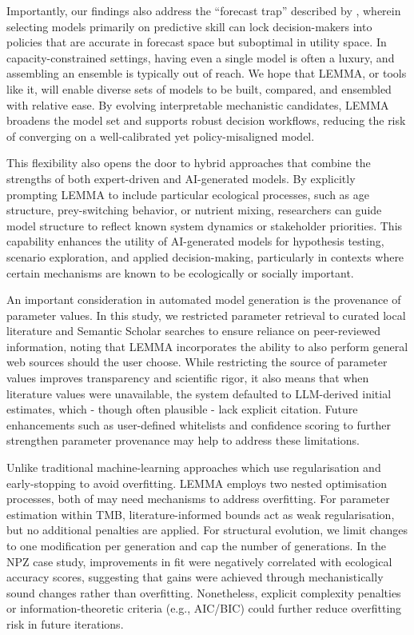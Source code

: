 Importantly, our findings also address the “forecast trap” described by \citep{Boettiger2022}, wherein selecting models primarily on predictive skill can lock decision-makers into policies that are accurate in forecast space but suboptimal in utility space. In capacity-constrained settings, having even a single model is often a luxury, and assembling an ensemble is typically out of reach. We hope that LEMMA, or tools like it, will enable diverse sets of models to be built, compared, and ensembled with relative ease. By evolving interpretable mechanistic candidates, LEMMA broadens the model set and supports robust decision workflows, reducing the risk of converging on a well-calibrated yet policy-misaligned model.

This flexibility also opens the door to hybrid approaches that combine the strengths of both expert-driven and AI-generated models. By explicitly prompting LEMMA to include particular ecological processes, such as age structure, prey-switching behavior, or nutrient mixing, researchers can guide model structure to reflect known system dynamics or stakeholder priorities. This capability enhances the utility of AI-generated models for hypothesis testing, scenario exploration, and applied decision-making, particularly in contexts where certain mechanisms are known to be ecologically or socially important. 

An important consideration in automated model generation is the provenance of parameter values. In this study, we restricted parameter retrieval to curated local literature and Semantic Scholar searches to ensure reliance on peer-reviewed information, noting that LEMMA incorporates the ability to also perform general web sources should the user choose. While restricting the source of parameter values improves transparency and scientific rigor, it also means that when literature values were unavailable, the system defaulted to LLM-derived initial estimates, which - though often plausible - lack explicit citation. Future enhancements such as user-defined whitelists and confidence scoring to further strengthen parameter provenance may help to address these limitations.

Unlike traditional machine-learning approaches which use regularisation and early-stopping to avoid overfitting. LEMMA employs two nested optimisation processes, both of may need mechanisms to address overfitting. For parameter estimation within TMB, literature-informed bounds act as weak regularisation, but no additional penalties are applied. For structural evolution, we limit changes to one modification per generation and cap the number of generations. In the NPZ case study, improvements in fit were negatively correlated with ecological accuracy scores, suggesting that gains were achieved through mechanistically sound changes rather than overfitting. Nonetheless, explicit complexity penalties or information-theoretic criteria (e.g., AIC/BIC) could further reduce overfitting risk in future iterations.

